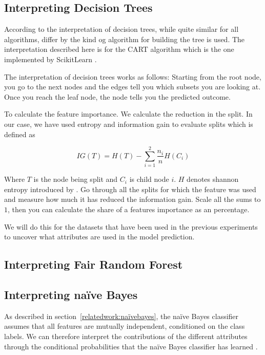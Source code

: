 \subsection{Interpreting Decision Trees}

According to \citet{Molnar:2020:Book} the interpretation of decision trees, while quite similar for all algorithms, differ by the kind og algorithm for building the tree is used. The interpretation described here is for the CART algorithm which is the one implemented by ScikitLearn \cite{Pedregosa:2011:JMLR}.

The interpretation of decision trees works as follows: Starting from the root node, you go to the next nodes and the edges tell you which subsets you are looking at. Once you reach the leaf node, the node tells you the predicted outcome. \cite{Molnar:2020:Book}

To calculate the feature importance. We calculate the reduction in the split. In our case, we have used entropy and information gain to evaluate splits which is defined as 

\begin{equation*}
    IG(T) = H(T) - \sum_{i = 1}^{2} \frac{n_i}{n} H(C_i)
\end{equation*}

Where $T$ is the node being split and $C_i$ is child node $i$. $H$ denotes shannon entropy introduced by \citet{Shannon:1948:BellSystTechJ}. Go through all the splits for which the feature was used and measure how much it has reduced the information gain. Scale all the sums to $1$, then you can calculate the share of a features importance as an percentage.

We will do this for the datasets that have been used in the previous experiments to uncover what attributes are used in the model prediction.

\subsection{Interpreting Fair Random Forest}



\subsection{Interpreting naïve Bayes}

As described in section~\ref{relatedwork:naïvebayes}, the naïve Bayes classifier assumes that all features are mutually independent, conditioned on the class labels. We can therefore interpret the contributions of the different attributes through the conditional probabilities that the naïve Bayes classifier has learned \cite[p.~142]{Molnar:2020:Book}.

